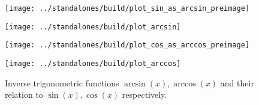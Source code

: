 \documentclass[../main]{subfiles}
\begin{document}
\begin{figure}[h]
        \centering
        \begin{minipage}{.45\textwidth}
          \texttt{[image: ../standalones/build/plot\_sin\_as\_arcsin\_preimage]}
        \end{minipage}
        \quad
        \begin{minipage}{.45\textwidth}
          \texttt{[image: ../standalones/build/plot\_arcsin]}
        \end{minipage}

        \vspace{2em}
        \begin{minipage}{.45\textwidth}
          \texttt{[image: ../standalones/build/plot\_cos\_as\_arccos\_preimage]}
        \end{minipage}
        \quad
        \begin{minipage}{.45\textwidth}
          \texttt{[image: ../standalones/build/plot\_arccos]}
        \end{minipage}


        \caption{Inverse trigonometric functions \(\arcsin(x), \arccos(x)\) and their relation to \(\sin(x), \cos(x)\) respectively.}
        \label{fig:arcsin-arccos}
      \end{figure}
\end{document}
